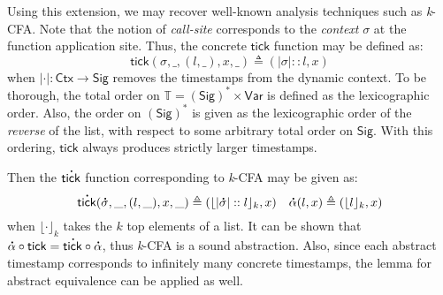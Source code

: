 \documentclass[acmsmall,screen,review]{acmart}\settopmatter{printfolios=true,printccs=false,printacmref=false}
\theoremstyle{acmdefinition}
\newcommand*{\cons}{::}
\newcommand*{\A}[1]{\overset{\,_{\mbox{\Large .}}}{#1}}
\newcommand*{\ExprVar}{\mathsf{Var}}
\newcommand*{\Time}{\mathbb{T}}
\newcommand*{\ctx}{\sigma}
\newcommand*{\Ctx}{\mathsf{Ctx}}
\newcommand*{\Sig}{\mathsf{Sig}}
\newcommand*{\tick}{\mathsf{tick}}
\begin{document}
Using this extension, we may recover well-known analysis techniques such as \emph{k}-CFA.
Note that the notion of \emph{call-site} corresponds to the \emph{context} $\ctx$ at the function application site.
Thus, the concrete $\tick$ function may be defined as:
\[\tick(\ctx,\_,(l,\_),x,\_)\triangleq(|\ctx|\cons l, x)\]
when $|\cdot|:\Ctx\rightarrow\Sig$ removes the timestamps from the dynamic context.
To be thorough, the total order on $\Time=(\Sig)^*\times\ExprVar$ is defined as the lexicographic order.
Also, the order on $(\Sig)^*$ is given as the lexicographic order of the \emph{reverse} of the list, with respect to some arbitrary total order on $\Sig$.
With this ordering, $\tick$ always produces strictly larger timestamps.

Then the $\A\tick$ function corresponding to \emph{k}-CFA may be given as:
\[\A\tick(\A\ctx,\_,(l,\_),x,\_)\triangleq(\lfloor|\A\ctx|\cons l\rfloor_k, x)\quad\A\alpha(l,x)\triangleq(\lfloor l\rfloor_k,x)\]
when $\lfloor\cdot\rfloor_k$ takes the $k$ top elements of a list.
It can be shown that $\A\alpha\circ\tick=\A\tick\circ\A\alpha$, thus \emph{k}-CFA is a sound abstraction.
Also, since each abstract timestamp corresponds to infinitely many concrete timestamps, the lemma for abstract equivalence can be applied as well.

\end{document}
